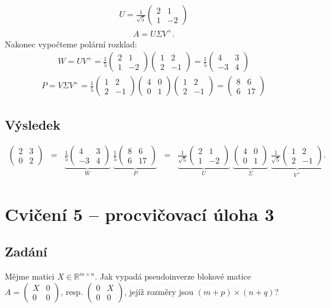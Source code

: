 \documentclass[]{article}
\newcommand{\mat}[1]{\begin{pmatrix}#1\end{pmatrix}}
\newcommand{\recip}[1]{\frac{1}{#1}}
\newcommand{\recipsqrt}[1]{\frac{1}{\sqrt{#1}}}
\newcommand{\x}{\times}
\begin{document}
\begin{align*}
  U = \recipsqrt{5} \mat{2&1\\1&-2}
\end{align*}
\begin{align*}
  A = U \Sigma V^+.
\end{align*}
Nakonec vypočteme polární rozklad:
\begin{align*}
  W = UV^+ = \recip{5} \mat{2&1\\1&-2} \mat{1&2\\2&-1} = \recip{5} \mat{4&3\\-3&4}
\end{align*}
\begin{align*}
  P = V \Sigma V^+ = \recip{5} \mat{1&2\\2&-1} \mat{4&0\\0&1} \mat{1&2\\2&-1} = \mat{8&6\\6&17}
\end{align*}

\subsection{Výsledek}
\begin{align*}
  \mat{2&3\\0&2}
  \;\;=\;\; \underbrace{\recip{5}\mat{4&3\\-3&4}}_W \; \underbrace{\recip{5}\mat{8&6\\6&17}}_P
  \;\;=\;\; \underbrace{\recipsqrt{5}\mat{2&1\\1&-2}}_U \; \underbrace{\mat{4&0\\0&1}}_\Sigma \; \underbrace{\recipsqrt{5} \mat{1&2\\2&-1}}_{V^+}.
\end{align*}


\section{Cvičení 5 – procvičovací úloha 3}
\subsection{Zadání}
Mějme matici $X \in \mathbb{R}^{m \x n}$. Jak vypadá pseudoinverze blokové matice $A = \mat{X&0\\0&0}$, resp. $\mat{0&X\\0&0}$, jejíž rozměry jsou $(m+p)\x(n+q)$?
\end{document}
